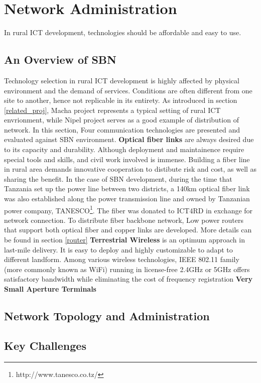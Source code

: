 \chapter{Network Administration}
In rural ICT development, technologies should be affordable and easy to use.
\section{An Overview of SBN}
Technology selection in rural ICT development is highly affected by physical environment and the demand of services. Conditions are often different from one site to another, hence not replicable in its entirety. As introduced in section \ref{related_proj}, Macha project represents a typical setting of rural ICT envrionment, while Nipel project serves as a good example of distribution of network. In this section, Four communication technologies are presented and evaluated against SBN environment.
\textbf{Optical fiber links} are always desired due to its capacity and durability. Although deployment and maintainence require special tools and skills, and civil work involved is immense. Building a fiber line in rural area demands innovative cooperation to distibute risk and cost, as well as sharing the benefit. In the case of SBN development, during the time that Tanzania set up the power line between two districts, a 140km optical fiber link was also established along the power transmission line and owned by Tanzanian power company, TANESCO\footnote{http://www.tanesco.co.tz/}. The fiber was donated to ICT4RD in exchange for network connection. To distribute fiber backbone network, Low power routers that support both optical fiber and copper links are developed. More details can be found in section \ref{router}
\textbf{Terrestrial Wireless} is an optimum approach in last-mile delivery. It is easy to deploy and highly customizable to adapt to different landform. Among various wireless technologies, IEEE 802.11 family (more commonly known as WiFi) running in license-free 2.4GHz or 5GHz offers satisfactory bandwidth while eliminating the cost of frequency registration
\textbf{Very Small Aperture Terminals}

\section{Network Topology and Administration}
\section{Key Challenges}
